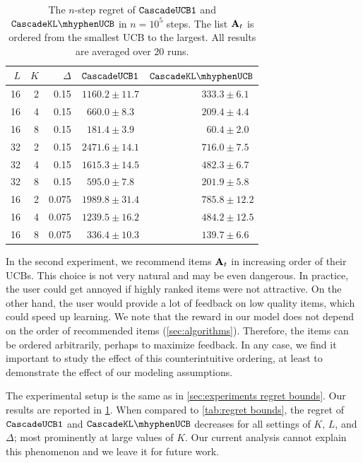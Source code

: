 \begin{table}[t]
  \centering
  {\small
  \begin{tabular}{rrr|rr} \hline
    $L$ & $K$ & $\Delta$ & ${\tt CascadeUCB1}$ & $\cascadeklucb$ \\ \hline
    16 & 2 & 0.15 & $1160.2 \pm 11.7$ & $333.3 \pm 6.1\phantom{0}$ \\
    16 & 4 & 0.15 & $660.0 \pm 8.3\phantom{0}$ & $209.4 \pm 4.4\phantom{0}$ \\
    16 & 8 & 0.15 & $181.4 \pm 3.9\phantom{0}$ & $60.4 \pm 2.0\phantom{0}$ \\
    32 & 2 & 0.15 & $2471.6 \pm 14.1$ & $716.0 \pm 7.5\phantom{0}$ \\
    32 & 4 & 0.15 & $1615.3 \pm 14.5$ & $482.3 \pm 6.7\phantom{0}$ \\
    32 & 8 & 0.15 & $595.0 \pm 7.8\phantom{0}$ & $201.9 \pm 5.8\phantom{0}$ \\
    16 & 2 & 0.075 & $1989.8 \pm 31.4$ & $785.8 \pm 12.2$ \\
    16 & 4 & 0.075 & $1239.5 \pm 16.2$ & $484.2 \pm 12.5$ \\
    16 & 8 & 0.075 & $336.4 \pm 10.3$ & $139.7 \pm 6.6\phantom{0}$ \\ \hline
  \end{tabular}
  }
  \caption{The $n$-step regret of ${\tt CascadeUCB1}$ and $\cascadeklucb$ in $n = 10^5$ steps. The list $\mathbf{A}_t$ is ordered from the smallest UCB to the largest. All results are averaged over $20$ runs.}
  \label{tab:worst-first}
\end{table}

In the second experiment, we recommend items $\mathbf{A}_t$ in increasing order of their UCBs. This choice is not very natural and may be even dangerous. In practice, the user could get annoyed if highly ranked items were not attractive. On the other hand, the user would provide a lot of feedback on low quality items, which could speed up learning. We note that the reward in our model does not depend on the order of recommended items (\cref{sec:algorithms}). Therefore, the items can be ordered arbitrarily, perhaps to maximize feedback. In any case, we find it important to study the effect of this counterintuitive ordering, at least to demonstrate the effect of our modeling assumptions.

The experimental setup is the same as in \cref{sec:experiments regret bounds}. Our results are reported in \cref{tab:worst-first}. When compared to \cref{tab:regret bounds}, the regret of ${\tt CascadeUCB1}$ and $\cascadeklucb$ decreases for all settings of $K$, $L$, and $\Delta$; most prominently at large values of $K$. Our current analysis cannot explain this phenomenon and we leave it for future work.


